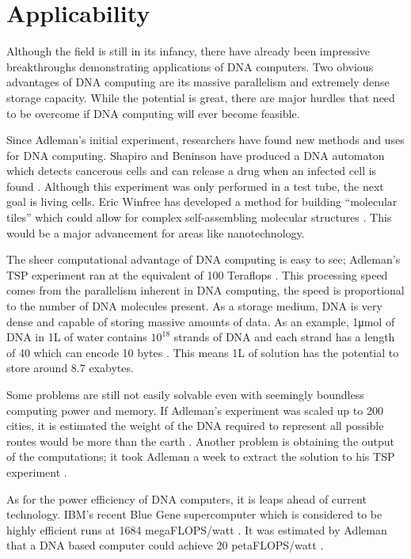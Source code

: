 \documentclass[twocolumn]{article}
\begin{document}
\section{Applicability}
Although the field is still in its infancy, there have already been
impressive breakthroughs demonstrating applications of DNA computers.
Two obvious advantages of DNA computing are its massive parallelism
and extremely dense storage capacity. While the potential is great,
there are major hurdles that need to be overcome if DNA computing will
ever become feasible.

Since Adleman's initial experiment, researchers have found new
methods and uses for DNA computing. Shapiro and Beninson have produced
a DNA automaton which detects cancerous cells and can release a drug
when an infected cell is found \cite{shapiro}. Although this experiment was
only
performed in a test tube, the next goal is living cells. Eric Winfree
has developed a method for building ``molecular tiles'' which could
allow for complex self-assembling molecular structures 
\cite{parker}. This would be a major advancement for areas like nanotechnology.

The sheer computational advantage of DNA computing is easy to see;
Adleman's TSP experiment ran at the equivalent of 100 Teraflops
\cite{parker}.
This processing speed comes from the parallelism inherent in DNA
computing, the speed is proportional to the number of DNA molecules
present.  As a storage medium, DNA is very dense and capable of storing
massive amounts of data. As an example, 1μmol of DNA in 1L of water
contains $10^{18}$ strands of DNA and each strand has a length of 40 which
can encode 10 bytes \cite{kari}. This means 1L of solution has the potential
to store around 8.7 exabytes.

Some problems are still not
easily solvable even with seemingly boundless computing power and
memory. If Adleman's experiment was scaled up to 200 cities, it is
estimated the weight of the DNA required to represent all possible
routes would be more than the earth 
\cite{parker}. Another problem is obtaining
the output of the computations; it took Adleman a week to extract the
solution to his TSP experiment \cite{parker}.

As for the power efficiency of DNA computers, it is leaps ahead of current
technology. IBM's recent Blue Gene supercomputer which is considered
to be highly efficient runs at 1684 megaFLOPS/watt \cite{drew}. It was
estimated by Adleman that a DNA based computer could achieve 20
petaFLOPS/watt \cite{kari}.
\end{document}
